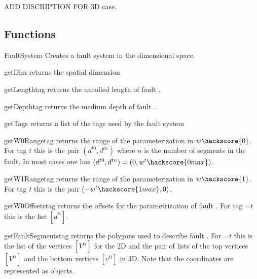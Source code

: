 ADD DISCRIPTION FOR 3D case.

\subsection{Functions}

\begin{classdesc}{FaultSystem}{
}
Creates a fault system in the  dimensional space.
\end{classdesc}



\begin{methoddesc}[FaultSystem]{getDim}{}
returns the spatial dimension
\end{methoddesc}
\begin{methoddesc}[FaultSystem]{getLength}{tag}
returns the unrolled length of fault .
\end{methoddesc}

\begin{methoddesc}[FaultSystem]{getDepth}{tag}
returns the medium depth of fault .
\end{methoddesc}

\begin{methoddesc}[FaultSystem]{getTags}{}
returns a list of the tags used by the fault system
\end{methoddesc}

\begin{methoddesc}[FaultSystem]{getW0Range}{tag}
returns the range of the parameterization in $w\hackscore{0}$.
For tag $t$ this is the pair $(d^{t0},d^{tn})$ where $n$ is the number of segments in the fault.
In most cases one has $(d^{t0},d^{tn})=(0,w^t\hackscore{0 max})$.
\end{methoddesc}

\begin{methoddesc}[FaultSystem]{getW1Range}{tag}
returns the range of the parameterization in  $w\hackscore{1}$.
For tag $t$ this is the pair $(-w^t\hackscore{1max},0)$.
\end{methoddesc}

\begin{methoddesc}[FaultSystem]{getW0Offsets}{tag}
returns the offsets for the parametrization of fault .
For tag =$t$ this is the list $[d^{ti}]$.
\end{methoddesc}


\begin{methoddesc}[FaultSystem]{getFaultSegments}{tag}
returns the polygons used to describe fault . For =$t$ this is the list of the vertices
$[V^{ti}]$ for the 2D and the pair of lists of the top vertices $[V^{ti}]$ and the bottom vertices  $[v^{ti}]$ in 3D.
Note that the coordinates are represented as \numpyNDA objects.
\end{methoddesc}

